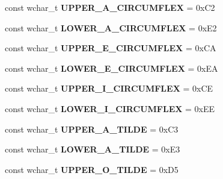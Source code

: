 \begin{DoxyCompactItemize}
\item 
\hypertarget{group___indexing_ga0db3e810078e521ab820575a64467abd}{const wchar\-\_\-t {\bfseries U\-P\-P\-E\-R\-\_\-\-A\-\_\-\-C\-I\-R\-C\-U\-M\-F\-L\-E\-X} = 0x\-C2}\label{group___indexing_ga0db3e810078e521ab820575a64467abd}

\item 
\hypertarget{group___indexing_gafed8c4d83a9f1f6efa6e7005888be389}{const wchar\-\_\-t {\bfseries L\-O\-W\-E\-R\-\_\-\-A\-\_\-\-C\-I\-R\-C\-U\-M\-F\-L\-E\-X} = 0x\-E2}\label{group___indexing_gafed8c4d83a9f1f6efa6e7005888be389}

\item 
\hypertarget{group___indexing_gafef243c0040c9e7b0b0b634b36f17232}{const wchar\-\_\-t {\bfseries U\-P\-P\-E\-R\-\_\-\-E\-\_\-\-C\-I\-R\-C\-U\-M\-F\-L\-E\-X} = 0x\-C\-A}\label{group___indexing_gafef243c0040c9e7b0b0b634b36f17232}

\item 
\hypertarget{group___indexing_ga1dcf91de4a6f00a48aad67156d2fc152}{const wchar\-\_\-t {\bfseries L\-O\-W\-E\-R\-\_\-\-E\-\_\-\-C\-I\-R\-C\-U\-M\-F\-L\-E\-X} = 0x\-E\-A}\label{group___indexing_ga1dcf91de4a6f00a48aad67156d2fc152}

\item 
\hypertarget{group___indexing_gaf2c71f6d4713500826b358f1cc7fdc98}{const wchar\-\_\-t {\bfseries U\-P\-P\-E\-R\-\_\-\-I\-\_\-\-C\-I\-R\-C\-U\-M\-F\-L\-E\-X} = 0x\-C\-E}\label{group___indexing_gaf2c71f6d4713500826b358f1cc7fdc98}

\item 
\hypertarget{group___indexing_ga682bae2a59d0caada2b79b6cb1b0a3df}{const wchar\-\_\-t {\bfseries L\-O\-W\-E\-R\-\_\-\-I\-\_\-\-C\-I\-R\-C\-U\-M\-F\-L\-E\-X} = 0x\-E\-E}\label{group___indexing_ga682bae2a59d0caada2b79b6cb1b0a3df}

\item 
\hypertarget{group___indexing_ga92ee2373651388d148d47c65660be3db}{const wchar\-\_\-t {\bfseries U\-P\-P\-E\-R\-\_\-\-A\-\_\-\-T\-I\-L\-D\-E} = 0x\-C3}\label{group___indexing_ga92ee2373651388d148d47c65660be3db}

\item 
\hypertarget{group___indexing_ga073c85a09786ebc50a105d6554a97bd5}{const wchar\-\_\-t {\bfseries L\-O\-W\-E\-R\-\_\-\-A\-\_\-\-T\-I\-L\-D\-E} = 0x\-E3}\label{group___indexing_ga073c85a09786ebc50a105d6554a97bd5}

\item 
\hypertarget{group___indexing_ga406d401a6d04ce844f6007eb5e2f46f6}{const wchar\-\_\-t {\bfseries U\-P\-P\-E\-R\-\_\-\-O\-\_\-\-T\-I\-L\-D\-E} = 0x\-D5}\label{group___indexing_ga406d401a6d04ce844f6007eb5e2f46f6}


\end{DoxyCompactItemize}
